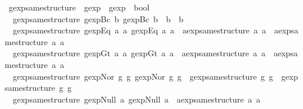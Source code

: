 \begin{isabellebody}
\ gexp{\isacharunderscore}same{\isacharunderscore}structure\ {\isacharcolon}{\isacharcolon}\ {\isachardoublequoteopen}gexp\ {\isasymRightarrow}\ gexp\ {\isasymRightarrow}\ bool{\isachardoublequoteclose}\ \isanewline
\ \ {\isachardoublequoteopen}gexp{\isacharunderscore}same{\isacharunderscore}structure\ {\isacharparenleft}gexp{\isachardot}Bc\ b{\isacharparenright}\ {\isacharparenleft}gexp{\isachardot}Bc\ b{\isacharprime}{\isacharparenright}\ {\isacharequal}\ {\isacharparenleft}b\ {\isacharequal}\ b{\isacharprime}{\isacharparenright}{\isachardoublequoteclose}\ {\isacharbar}\isanewline
\ \ {\isachardoublequoteopen}gexp{\isacharunderscore}same{\isacharunderscore}structure\ {\isacharparenleft}gexp{\isachardot}Eq\ a{}\ a{}{\isacharparenright}\ {\isacharparenleft}gexp{\isachardot}Eq\ a{}{\isacharprime}\ a{}{\isacharprime}{\isacharparenright}\ {\isacharequal}\ {\isacharparenleft}aexp{\isacharunderscore}same{\isacharunderscore}structure\ a{}\ a{}{\isacharprime}\ {\isasymand}\ aexp{\isacharunderscore}same{\isacharunderscore}structure\ a{}\ a{}{\isacharprime}{\isacharparenright}{\isachardoublequoteclose}\ {\isacharbar}\isanewline
\ \ {\isachardoublequoteopen}gexp{\isacharunderscore}same{\isacharunderscore}structure\ {\isacharparenleft}gexp{\isachardot}Gt\ a{}\ a{}{\isacharparenright}\ {\isacharparenleft}gexp{\isachardot}Gt\ a{}{\isacharprime}\ a{}{\isacharprime}{\isacharparenright}\ {\isacharequal}\ {\isacharparenleft}aexp{\isacharunderscore}same{\isacharunderscore}structure\ a{}\ a{}{\isacharprime}\ {\isasymand}\ aexp{\isacharunderscore}same{\isacharunderscore}structure\ a{}\ a{}{\isacharprime}{\isacharparenright}{\isachardoublequoteclose}\ {\isacharbar}\isanewline
\ \ {\isachardoublequoteopen}gexp{\isacharunderscore}same{\isacharunderscore}structure\ {\isacharparenleft}gexp{\isachardot}Nor\ g{}\ g{}{\isacharparenright}\ {\isacharparenleft}gexp{\isachardot}Nor\ g{}{\isacharprime}\ g{}{\isacharprime}{\isacharparenright}\ {\isacharequal}\ {\isacharparenleft}gexp{\isacharunderscore}same{\isacharunderscore}structure\ g{}\ g{}{\isacharprime}\ {\isasymand}\ gexp{\isacharunderscore}same{\isacharunderscore}structure\ g{}\ g{}{\isacharprime}{\isacharparenright}{\isachardoublequoteclose}\ {\isacharbar}\isanewline
\ \ {\isachardoublequoteopen}gexp{\isacharunderscore}same{\isacharunderscore}structure\ {\isacharparenleft}gexp{\isachardot}Null\ a{}{\isacharparenright}\ {\isacharparenleft}gexp{\isachardot}Null\ a{}{\isacharparenright}\ {\isacharequal}\ aexp{\isacharunderscore}same{\isacharunderscore}structure\ a{}\ a{}{\isachardoublequoteclose}\ {\isacharbar}\isanewline

\end{isabellebody}
